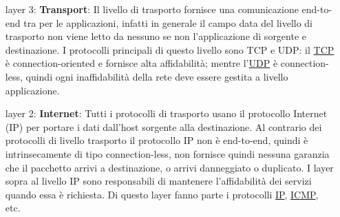 \begin{enumerate}

    \item[layer 3:] \textbf{Transport}: Il livello di trasporto fornisce una comunicazione end-to-end tra per le applicazioni, infatti in generale il campo data del livello di trasporto non viene letto da nessuno se non l'applicazione di sorgente e destinazione. I protocolli principali di questo livello sono TCP e UDP: il \href{https://en.wikipedia.org/wiki/Transmission_Control_Protocol}{TCP} è connection-oriented e fornisce alta affidabilità; mentre l'\href{https://en.wikipedia.org/wiki/User_Datagram_Protocol}{UDP} è connection-less, quindi ogni inaffidabilità della rete deve essere gestita a livello applicazione.

    \item[layer 2:] \textbf{Internet}: Tutti i protocolli di trasporto usano il protocollo Internet (IP) per portare i dati dall'host sorgente alla destinazione. Al contrario dei protocolli di livello trasporto il protocollo IP non è end-to-end, quindi è intrinsecamente di tipo connection-less, non fornisce quindi nessuna garanzia che il pacchetto arrivi a destinazione, o arrivi danneggiato o duplicato. I layer sopra al livello IP sono responsabili di mantenere l'affidabilità dei servizi quando essa è richiesta. Di questo layer fanno parte i protocolli \href{https://en.wikipedia.org/wiki/Internet_Protocol}{IP}, \href{https://en.wikipedia.org/wiki/Internet_Control_Message_Protocol}{ICMP}, etc.


\end{enumerate}

